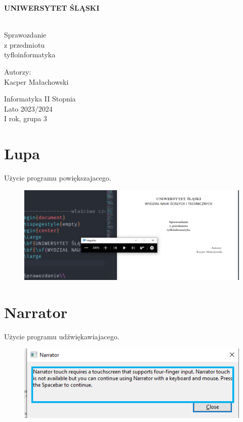 \documentclass[12pt,oneside,a4paper]{book} %
\theoremstyle{break}
\begin{document}
\thispagestyle{empty}
\begin{center}
  \Large
  \bf{UNIWERSYTET ŚLĄSKI}\\
  \bf{}\\[25mm]
  \large


  Sprawozdanie\\
  z przedmiotu\\
  tyfloinformatyka\\[25mm]
\end{center}
\begin{flushright}
  \large
  Autorzy:\\
  Kacper Małachowski\\
\end{flushright}
\vspace*{\fill}
\begin{center}
  Informatyka II Stopnia\\
  Lato 2023/2024\\
  I rok, grupa 3\\[25mm]
\end{center}

\chapter*{Lupa}

Użycie programu powiększajacego.

\begin{figure}[H]
  \centering
  \includegraphics[width=1\textwidth]{magnifier.png}
\end{figure}

\chapter*{Narrator}

Użycie programu udźwiękawiajacego.

\begin{figure}[H]
  \centering
  \includegraphics[width=1\textwidth]{narrator.png}
\end{figure}
\end{document}
